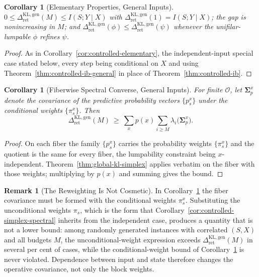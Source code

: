 \documentclass[12pt]{article}
\newtheorem{corollary}[theorem]{Corollary}
\theoremstyle{definition}
\newtheorem{remark}[theorem]{Remark}
\newcommand{\RetKLg}{\Delta_{\mathrm{ret}}^{\mathrm{KL,gen}}}
\begin{document}
\begin{corollary}[Elementary Properties, General Inputs]
\label{cor:controlled-elementary-general}
$0\le\RetKLg(M)\le I(S;Y\mid X)$ with $\RetKLg(1)=I(S;Y\mid X)$; the gap is
nonincreasing in $M$; and $\RetKLg(\phi)\le\RetKLg(\psi)$ whenever the
unifilar-lumpable $\phi$ refines $\psi$.
\end{corollary}

\begin{proof}
As in Corollary~\ref{cor:controlled-elementary}, the independent-input special
case stated below, every step being conditional on $X$ and using
Theorem~\ref{thm:controlled-ib-general} in place of Theorem~\ref{thm:controlled-ib}.
\end{proof}

\begin{corollary}[Fiberwise Spectral Converse, General Inputs]
\label{cor:controlled-simplex-general}
For finite $\mathcal O$, let $\bm{\Sigma}_p^{x}$ denote the covariance of the
predictive probability vectors $\{p_s^x\}$ under the \emph{conditional} weights
$\{\pi_s^x\}$.  Then
\[
\RetKLg(M)
\ \ge\
\sum_xp(x)\sum_{i\ge M}\lambda_i\bigl(\bm{\Sigma}_p^{x}\bigr).
\]
\end{corollary}

\begin{proof}
On each fiber the family $\{p_s^x\}$ carries the probability weights
$\{\pi_s^x\}$ and the quotient is the same for every fiber, the lumpability
constraint being $x$-independent.  Theorem~\ref{thm:global-kl-simplex} applies
verbatim on the fiber with those weights; multiplying by $p(x)$ and summing
gives the bound.
\end{proof}

\begin{remark}[The Reweighting Is Not Cosmetic]
\label{rem:controlled-general-reweighting}
In Corollary~\ref{cor:controlled-simplex-general} the fiber covariance must be
formed with the conditional weights $\pi_s^x$.  Substituting the unconditional
weights $\pi_s$, which is the form that Corollary~\ref{cor:controlled-simplex-spectral}
inherits from the independent case, produces a quantity that is not a lower
bound: among randomly generated instances with correlated $(S,X)$ and all
budgets $M$, the unconditional-weight expression exceeds $\RetKLg(M)$ in
several per cent of cases, while the conditional-weight bound of
Corollary~\ref{cor:controlled-simplex-general} is never violated.  Dependence
between input and state therefore changes the operative covariance, not only
the block weights.
\end{remark}
\end{document}
